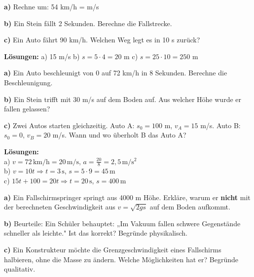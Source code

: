 \documentclass[11pt,a4paper]{article}
\begin{document}
\begin{aufgabe}
\textbf{a)} Rechne um: 54 km/h = \underline{\hspace{2cm}} m/s

\textbf{b)} Ein Stein fällt 2 Sekunden. Berechne die Fallstrecke.

\textbf{c)} Ein Auto fährt 90 km/h. Welchen Weg legt es in 10 s zurück?
\end{aufgabe}

\textbf{Lösungen:} a) 15 m/s \quad b) $s = 5 \cdot 4 = 20$ m \quad c) $s = 25 \cdot 10 = 250$ m

\vspace{0.5cm}

\begin{aufgabe}
\textbf{a)} Ein Auto beschleunigt von 0 auf 72 km/h in 8 Sekunden. Berechne die Beschleunigung.

\textbf{b)} Ein Stein trifft mit 30 m/s auf dem Boden auf. Aus welcher Höhe wurde er fallen gelassen?

\textbf{c)} Zwei Autos starten gleichzeitig. Auto A: $s_0 = 100$ m, $v_A = 15$ m/s. Auto B: $s_0 = 0$, $v_B = 20$ m/s. Wann und wo überholt B das Auto A?
\end{aufgabe}

\textbf{Lösungen:}\\
a) $v = 72\,\mathrm{km/h} = 20\,\mathrm{m/s}$, $a = \frac{20}{8} = 2{,}5\,\mathrm{m/s^2}$\\
b) $v = 10t \Rightarrow t = 3\,\mathrm{s}$, $s = 5 \cdot 9 = 45\,\mathrm{m}$\\
c) $15t + 100 = 20t \Rightarrow t = 20\,\mathrm{s}$, $s = 400\,\mathrm{m}$

\vspace{0.5cm}

\begin{aufgabe}
\textbf{a)} Ein Fallschirmspringer springt aus 4000 m Höhe. Erkläre, warum er \textbf{nicht} mit der berechneten Geschwindigkeit aus $v = \sqrt{2gs}$ auf dem Boden aufkommt.

\textbf{b)} Beurteile: Ein Schüler behauptet: „Im Vakuum fallen schwere Gegenstände schneller als leichte." Ist das korrekt? Begründe physikalisch.

\textbf{c)} Ein Konstrukteur möchte die Grenzgeschwindigkeit eines Fallschirms halbieren, ohne die Masse zu ändern. Welche Möglichkeiten hat er? Begründe qualitativ.
\end{aufgabe}
\end{document}
